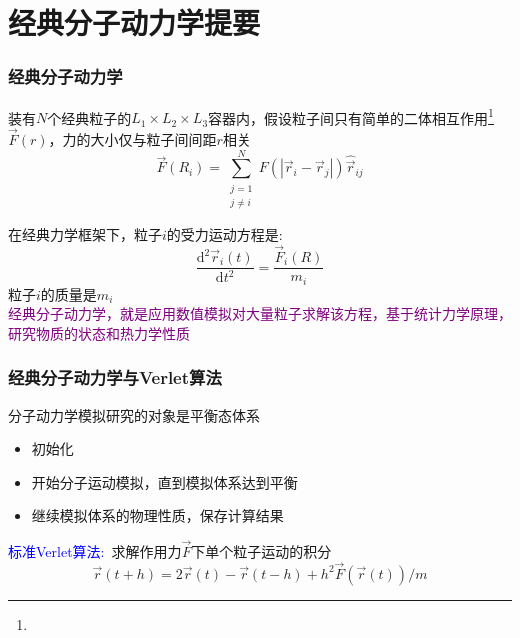 \section{经典分子动力学提要}
\frame
{
	\frametitle{经典分子动力学}
	装有$N$个经典粒子的$L_1\times L_2\times L_3$容器内，假设粒子间只有简单的二体相互作用\footnote{\fontsize{7.2pt}{6.2pt}\selectfont{二体作用是粒子间多体相互作用的简化，只考虑粒子两两间彼此相互作用。}}$\vec F(r)$，力的大小仅与粒子间间距$r$相关
	\begin{displaymath}
		\vec F(R_i)=\sum_{\substack{j=1\\j\neq i}}^N F(|\vec r_i-\vec r_j|)\hat{\vec r}_{ij}
	\end{displaymath}
	{\fontsize{7.2pt}{6.2pt}}

	在经典力学框架下，粒子$i$的受力运动方程是:~
	\begin{displaymath}
		\dfrac{\mathrm{d}^2\vec r_i(t)}{\mathrm{d}t^2}=\dfrac{\vec F_i(R)}{m_i}
	\end{displaymath}
	粒子$i$的质量是$m_i$\\
	\textcolor{purple}{经典分子动力学，就是应用数值模拟对大量粒子求解该方程，基于统计力学原理，研究物质的状态和热力学性质}
}

\frame
{
	\frametitle{经典分子动力学与\textrm{Verlet}算法}
	分子动力学模拟研究的对象是平衡态体系
	\begin{itemize}
		\item 初始化
		\item 开始分子运动模拟，直到模拟体系达到平衡
		\item 继续模拟体系的物理性质，保存计算结果
	\end{itemize}
	\textcolor{blue}{标准\textrm{Verlet}算法:~}求解作用力$\vec F$下单个粒子运动的积分
	\begin{displaymath}
		\vec r(t+h)=2\vec r(t)-\vec r(t-h)+h^2\vec F(\vec r(t))/m
	\end{displaymath}
	{\fontsize{7.2pt}{6.2pt}}
}

